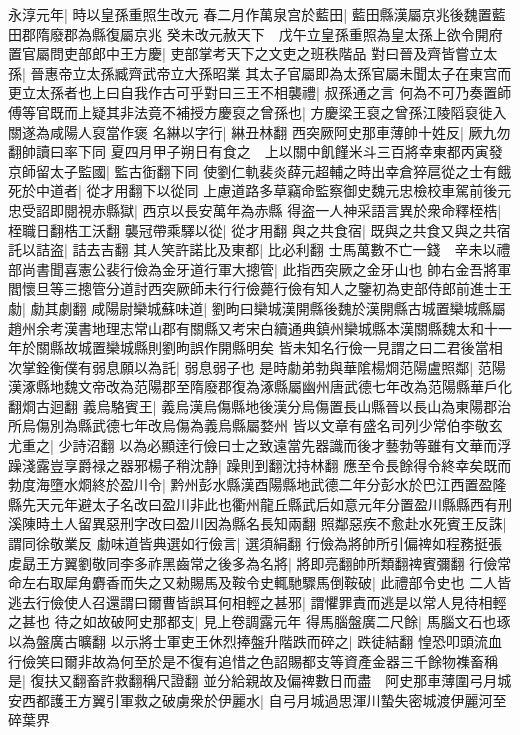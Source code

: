 永淳元年|{
	時以皇孫重照生改元}
春二月作萬泉宫於藍田|{
	藍田縣漢屬京兆後魏置藍田郡隋廢郡為縣復屬京兆}
癸未改元赦天下　戊午立皇孫重照為皇太孫上欲令開府置官屬問吏部郎中王方慶|{
	吏部掌考天下之文吏之班秩階品}
對曰晉及齊皆嘗立太孫|{
	晉惠帝立太孫臧齊武帝立大孫昭業}
其太子官屬即為太孫官屬未聞太子在東宫而更立太孫者也上曰自我作古可乎對曰三王不相襲禮|{
	叔孫通之言}
何為不可乃奏置師傅等官既而上疑其非法竟不補授方慶裒之曾孫也|{
	方慶梁王裒之曾孫江陵䧟裒徙入關遂為咸陽人裒當作褒}
名綝以字行|{
	綝丑林翻}
西突厥阿史那車薄帥十姓反|{
	厥九勿翻帥讀曰率下同}
夏四月甲子朔日有食之　上以關中飢饉米斗三百將幸東都丙寅發京師留太子監國|{
	監古衘翻下同}
使劉仁軌裴炎薛元超輔之時出幸倉猝扈從之士有餓死於中道者|{
	從才用翻下以從同}
上慮道路多草竊命監察御史魏元忠檢校車駕前後元忠受詔即閱視赤縣獄|{
	西京以長安萬年為赤縣}
得盗一人神采語言異於衆命釋桎梏|{
	桎職日翻梏工沃翻}
襲冠帶乘驛以從|{
	從才用翻}
與之共食宿|{
	既與之共食又與之共宿}
託以詰盗|{
	詰去吉翻}
其人笑許諾比及東都|{
	比必利翻}
士馬萬數不亡一錢　辛未以禮部尚書聞喜憲公裴行儉為金牙道行軍大摠管|{
	此指西突厥之金牙山也}
帥右金吾將軍閻懷旦等三摠管分道討西突厥師未行行儉薨行儉有知人之鑒初為吏部侍郎前進士王勮|{
	勮其劇翻}
咸陽尉欒城蘇味道|{
	劉昫曰欒城漢開縣後魏於漢開縣古城置欒城縣屬趙州余考漢書地理志常山郡有關縣又考宋白續通典鎮州欒城縣本漢關縣魏太和十一年於關縣故城置欒城縣則劉昫誤作開縣明矣}
皆未知名行儉一見謂之曰二君後當相次掌銓衡僕有弱息願以為託|{
	弱息弱子也}
是時勮弟勃與華隂楊烱范陽盧照鄰|{
	范陽漢涿縣地魏文帝改為范陽郡至隋廢郡復為涿縣屬幽州唐武德七年改為范陽縣華戶化翻烱古迴翻}
義烏駱賓王|{
	義烏漢烏傷縣地後漢分烏傷置長山縣晉以長山為東陽郡治所烏傷別為縣武德七年改烏傷為義烏縣屬婺州}
皆以文章有盛名司列少常伯李敬玄尤重之|{
	少詩沼翻}
以為必顯逹行儉曰士之致遠當先器識而後才藝勃等雖有文華而浮躁淺露豈享爵禄之器邪楊子稍沈静|{
	躁則到翻沈持林翻}
應至令長餘得令終幸矣既而勃度海墮水烱終於盈川令|{
	黔州彭水縣漢酉陽縣地武德二年分彭水於巴江西置盈隆縣先天元年避太子名改曰盈川非此也衢州龍丘縣武后如意元年分置盈川縣縣西有刑溪陳時土人留異惡刑字改曰盈川因為縣名長知兩翻}
照鄰惡疾不愈赴水死賓王反誅|{
	謂同徐敬業反}
勮味道皆典選如行儉言|{
	選須絹翻}
行儉為將帥所引偏禆如程務挺張䖍勗王方翼劉敬同李多祚黑齒常之後多為名將|{
	將即亮翻帥所類翻禆賓彌翻}
行儉常命左右取犀角麝香而失之又勑賜馬及鞍令史輒馳驟馬倒鞍破|{
	此禮部令史也}
二人皆逃去行儉使人召還謂曰爾曹皆誤耳何相輕之甚邪|{
	謂懼罪責而逃是以常人見待相輕之甚也}
待之如故破阿史那都支|{
	見上卷調露元年}
得馬腦盤廣二尺餘|{
	馬腦文石也琢以為盤廣古曠翻}
以示將士軍吏王休烈捧盤升階跌而碎之|{
	跌徒結翻}
惶恐叩頭流血行儉笑曰爾非故為何至於是不復有追惜之色詔賜都支等資產金器三千餘物襍畜稱是|{
	復扶又翻畜許救翻稱尺證翻}
並分給親故及偏禆數日而盡　阿史那車薄圍弓月城安西都護王方翼引軍救之破虜衆於伊麗水|{
	自弓月城過思渾川蟄失密城渡伊麗河至碎葉界}
